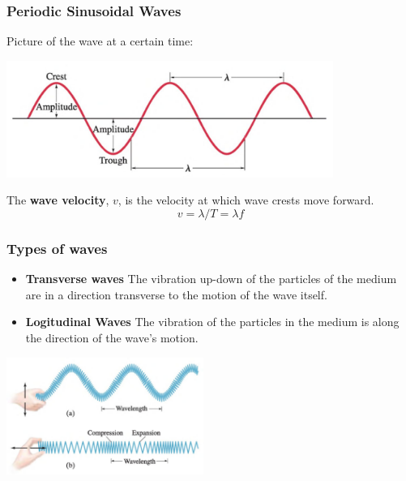 \documentclass[]{beamer}
\begin{document}
\begin{frame}
\frametitle{Periodic Sinusoidal Waves}



Picture of the wave at a certain time:
\pause

\vspace{5mm}

  \begin{center}
  \includegraphics[height=1.5in]{images4/2.jpg}
\end{center}
\pause
The \textbf{wave velocity}, $v$, is the velocity at which wave crests move forward. 
\pause
\begin{equation}
v=\lambda /T=\lambda f
\end{equation}

  \end{frame}

\begin{frame}
\frametitle{Types of waves}
\pause
 \begin{itemize}
\item \textbf{Transverse waves} The vibration up-down  of the particles of the medium are in a direction transverse to the motion of the wave itself.
\pause
\item \textbf{Logitudinal Waves} The vibration of the particles in the medium is along the direction of the wave's motion.
\pause
\end{itemize}

\pause

 \begin{center}
  \includegraphics[height=1.5in]{images4/3.jpg}
\end{center}

  \end{frame}
\end{document}
